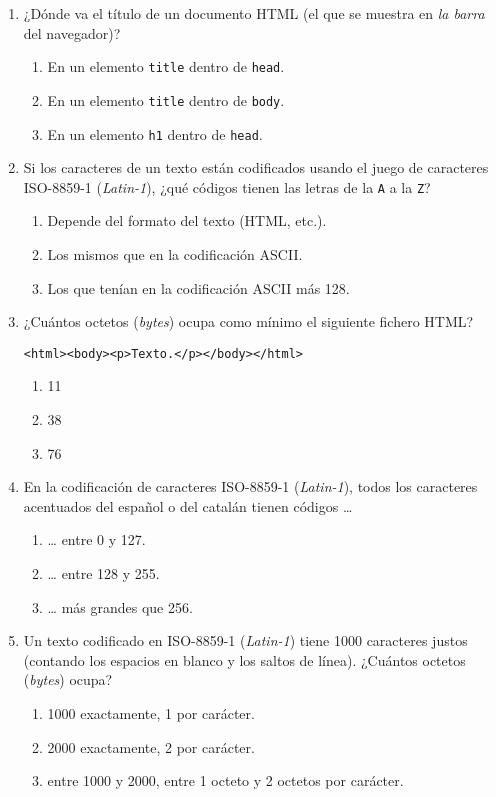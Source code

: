 {\begin{enumerate}
\item ¿Dónde va el título de un documento HTML (el que se muestra en \emph{la barra} del navegador)? \begin{enumerate} \item En un elemento \verb|title| dentro de \verb|head|. \item En un elemento \verb|title| dentro de \verb|body|. \item En un elemento \verb|h1| dentro de \verb|head|. \end{enumerate} 

\item Si los caracteres de un texto están codificados usando el juego de caracteres ISO-8859-1 (\emph{Latin-1}), ¿qué códigos tienen las letras de la \verb|A| a la \verb|Z|? \begin{enumerate} \item Depende del formato del texto (HTML, etc.). \item Los mismos que en la codificación ASCII. \item Los que tenían en la codificación ASCII más 128. \end{enumerate} 

\item ¿Cuántos octetos (\emph{bytes}) ocupa como mínimo el siguiente fichero HTML? \begin{center} \verb|<html><body><p>Texto.</p></body></html>| \end{center} \begin{enumerate} \item 11 \item 38 \item 76 \end{enumerate} 

\item En la codificación de caracteres ISO-8859-1 (\emph{Latin-1}), todos los caracteres acentuados del español o del catalán tienen códigos {\ldots} \begin{enumerate} \item {\ldots} entre 0 y 127. \item {\ldots} entre 128 y 255. \item {\ldots} más grandes que 256. \end{enumerate} 

\item Un texto codificado en ISO-8859-1 (\emph{Latin-1}) tiene 1000 caracteres justos (contando los espacios en blanco y los saltos de línea). ¿Cuántos octetos (\emph{bytes}) ocupa? \begin{enumerate} \item 1000 exactamente, 1 por carácter. \item 2000 exactamente, 2 por carácter. \item entre 1000 y 2000, entre 1 octeto y 2 octetos por carácter. \end{enumerate} 


\end{enumerate}}
